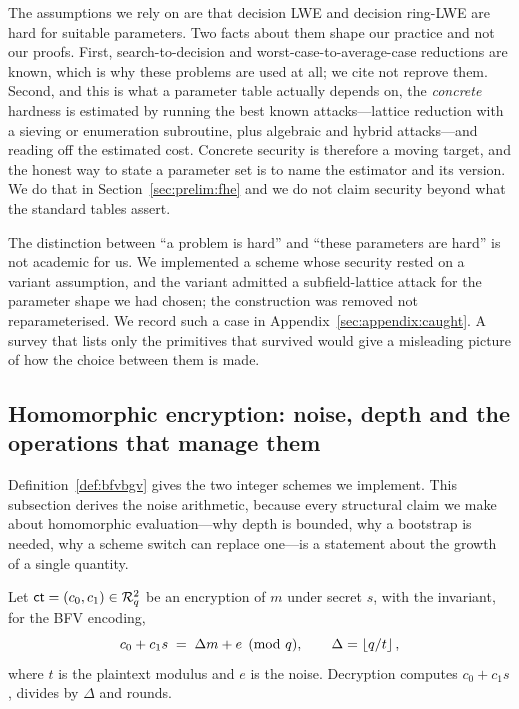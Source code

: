The assumptions we rely on are that decision LWE and decision ring-LWE are hard
for suitable parameters. Two facts about them shape our practice and not our proofs. First, search-to-decision and worst-case-to-average-case reductions are
known, which is why these problems are used at all; we cite not reprove
them. Second, and this is what a parameter table actually depends on, the
\emph{concrete} hardness is estimated by running the best known attacks---lattice
reduction with a sieving or enumeration subroutine, plus algebraic and hybrid
attacks---and reading off the estimated cost. Concrete security is therefore a
moving target, and the honest way to state a parameter set is to name the estimator
and its version. We do that in Section~\ref{sec:prelim:fhe} and we do not claim
security beyond what the standard tables assert.

\begin{remark}
\label{rem:ntru-lesson}
The distinction between ``a problem is hard'' and ``these parameters are hard'' is
not academic for us. We implemented a scheme whose security rested on a variant
assumption, and the variant admitted a subfield-lattice attack for the parameter
shape we had chosen; the construction was removed not reparameterised. We
record such a case in Appendix~\ref{sec:appendix:caught}. A survey that lists only
the primitives that survived would give a misleading picture of how the choice
between them is made.
\end{remark}

\subsection{Homomorphic encryption: noise, depth and the operations that manage them}
\label{sec:found:fhe}

Definition~\ref{def:bfvbgv} gives the two integer schemes we implement. This
subsection derives the noise arithmetic, because every structural claim we make
about homomorphic evaluation---why depth is bounded, why a bootstrap is needed,
why a scheme switch can replace one---is a statement about the growth of a single
quantity.

Let $\mathsf{ct} = (c_0,c_1) \in \mathcal{R}_q^2$ be an encryption of $m$ under secret $s$,
with the invariant, for the BFV encoding,
\begin{equation}
\label{eq:bfv-inv}
  c_0 + c_1 s \;=\; \Delta m + e \pmod q, \qquad \Delta = \left\lfloor q/t \right\rfloor,
\end{equation}
where $t$ is the plaintext modulus and $e$ is the noise. Decryption computes
$c_0 + c_1 s$, divides by $\Delta$ and rounds.


